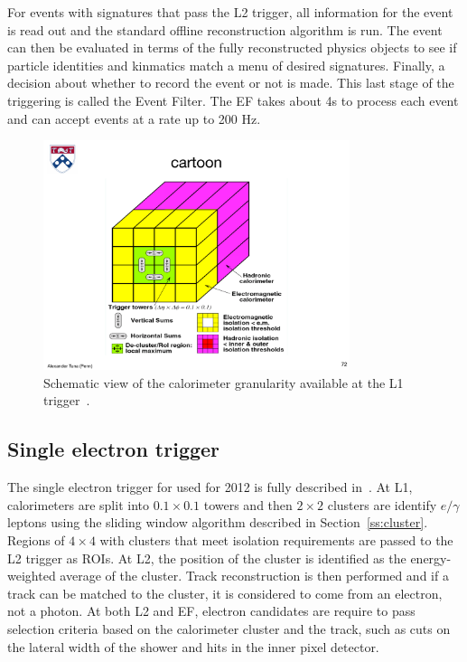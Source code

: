 For events with signatures that pass the L2 trigger, all information for the event is read out and the standard offline reconstruction algorithm is run. The event can then be evaluated in terms of the fully reconstructed physics objects to see if particle identities and kinmatics match a menu of desired signatures. Finally, a decision about whether to record the event or not is made. This last stage of the triggering is called the Event Filter. The EF takes about 4s to process each event and can accept events at a rate up to 200 Hz.


\begin{figure}[tp]
  \centering
  \includegraphics[width=0.80\textwidth]{fig/atlas/cartoonL1.pdf}
  \caption{Schematic view of the calorimeter granularity available at the L1 trigger~\cite{TDR-L1}.}
  \label{fig:l1}
\end{figure}
\subsection{Single electron trigger}
The single electron trigger for used for 2012 is fully described in~\cite{eltrig}. At L1, calorimeters are split into $0.1\times0.1$ towers and then $2\times 2$ clusters are identify $e/\gamma$ leptons using the sliding window algorithm described in Section~\ref{ss:cluster}. Regions of $4\times 4$ with clusters that meet isolation requirements are passed to the L2 trigger as ROIs. At L2, the position of the cluster is identified as the energy-weighted average of the cluster. Track reconstruction is then performed and if a track can be matched to the cluster, it is considered to come from an electron, not a photon. At both L2 and EF, electron candidates are require to pass selection criteria based on the calorimeter cluster and the track, such as cuts on the lateral width of the shower and hits in the inner pixel detector.

